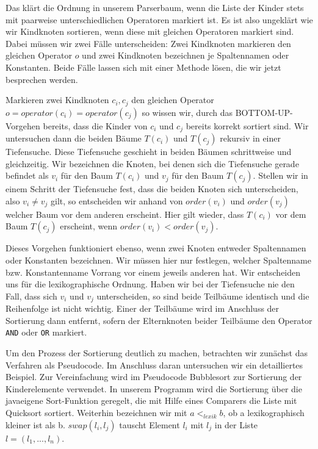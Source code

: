 Das klärt die Ordnung in unserem Parserbaum, wenn die Liste der Kinder stets mit paarweise unterschiedlichen Operatoren markiert ist. Es ist also ungeklärt wie wir Kindknoten sortieren, wenn diese mit gleichen Operatoren markiert sind. Dabei müssen wir zwei Fälle unterscheiden: Zwei Kindknoten markieren den gleichen Operator $o$ und zwei Kindknoten bezeichnen je Spaltennamen oder Konstanten. Beide Fälle lassen sich mit einer Methode lösen, die wir jetzt besprechen werden.

Markieren zwei Kindknoten $c_i,c_j$ den gleichen Operator $o = operator(c_i) = operator(c_j)$ so wissen wir, durch das BOTTOM-UP-Vorgehen bereits, dass die Kinder von $c_i$ und $c_j$ bereits korrekt sortiert sind. Wir untersuchen dann die beiden Bäume $T(c_i)$ und $T(c_j)$ rekursiv in einer Tiefensuche. Diese Tiefensuche geschieht in beiden Bäumen schrittweise und gleichzeitig. Wir bezeichnen die Knoten, bei denen sich die Tiefensuche gerade befindet als $v_i$ für den Baum $T(c_i)$ und $v_j$ für den Baum $T(c_j)$. Stellen wir in einem Schritt der Tiefensuche fest, dass die beiden Knoten sich unterscheiden, also $v_i \neq v_j$ gilt, so entscheiden wir anhand von $order(v_i)$ und $order(v_j)$ welcher Baum vor dem anderen erscheint. Hier gilt wieder, dass $T(c_i)$ vor dem Baum $T(c_j)$ erscheint, wenn $order(v_i) < order(v_j)$. 

Dieses Vorgehen funktioniert ebenso, wenn zwei Knoten entweder Spaltennamen oder Konstanten bezeichnen. Wir müssen hier nur festlegen, welcher Spaltenname bzw. Konstantenname Vorrang vor einem jeweils anderen hat. Wir entscheiden uns  für die lexikographische Ordnung. Haben wir bei der Tiefensuche nie den Fall, dass sich $v_i$ und $v_j$ unterscheiden, so sind beide Teilbäume identisch und die Reihenfolge ist nicht wichtig. Einer der Teilbäume wird im Anschluss der Sortierung dann entfernt, sofern der Elternknoten beider Teilbäume den Operator \verb|AND| oder \verb|OR| markiert.

Um den Prozess der Sortierung deutlich zu machen, betrachten wir zunächst das Verfahren als Pseudocode. Im Anschluss daran untersuchen wir ein detailliertes Beispiel. Zur Vereinfachung wird im Pseudocode Bubblesort zur Sortierung der Kinderelemente verwendet. In unserem Programm wird die Sortierung über die javaeigene Sort-Funktion geregelt, die mit Hilfe eines Comparers die Liste mit Quicksort sortiert. Weiterhin bezeichnen wir mit $a <_{lexik} b$, ob a lexikographisch kleiner ist als b. $swap(l_i,l_j)$ tauscht Element $l_i$ mit $l_j$ in der Liste $l=(l_1,...,l_n)$. 


